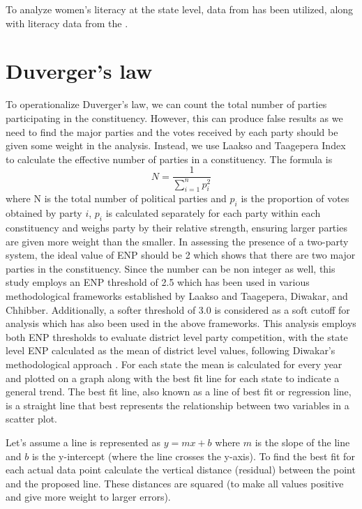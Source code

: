 To analyze women's literacy at the state level, data from \cite{census1991,census2001,census2011} has been utilized, along with literacy data from the \cite{NSC2017}.

\section{Duverger's law}
To operationalize Duverger's law, we can count the total number of parties participating in the constituency. However, this can produce false results as we need to find the major parties and the votes received by each party should be given some weight in the analysis. Instead, we use Laakso and Taagepera Index \citep{laakso1979effective} to calculate the effective number of parties in a constituency. The formula is
\begin{equation*}
N = \frac{1}{\sum_{i=1}^{n} p_i^2}
\end{equation*}
where N is the total number of political parties and $p_i$ is the proportion of votes obtained by party $i$, $p_i$ is calculated separately for each party within each constituency and weighs party by their relative strength, ensuring larger parties are given more weight than the smaller. In assessing the presence of a two-party system, the ideal value of ENP should be 2 which shows that there are two major parties in the constituency. Since the number can be non integer as well, this study employs an ENP threshold of 2.5 which has been used in various methodological frameworks established by Laakso and Taagepera, Diwakar, and Chhibber. Additionally, a softer threshold of 3.0 is considered as a soft cutoff for analysis which has also been used in the above frameworks. This analysis employs both ENP thresholds to evaluate district level party competition, with the state level ENP calculated as the mean of district level values, following Diwakar's methodological approach \citep{diwakar2007duverger}. For each state the mean is calculated for every year and plotted on a graph along with the best fit line for each state to indicate a general trend. The best fit line, also known as a line of best fit or regression line, is a straight line that best represents the relationship between two variables in a scatter plot. 

\vspace{0.3cm}

Let's assume a line is represented as $y = mx + b$ where $m$ is the slope of the line and $b$ is the y-intercept (where the line crosses the y-axis). To find the best fit for each actual data point calculate the vertical distance (residual) between the point and the proposed line. These distances are squared (to make all values positive and give more weight to larger errors).

